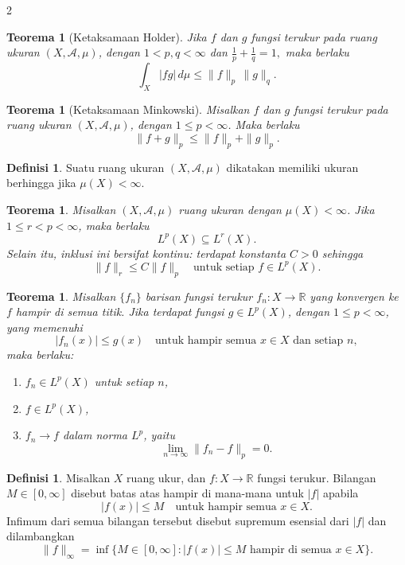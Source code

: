 \documentclass[a4paper,extrafontsizes, 9pt]{memoir}
\theoremstyle{definition}
\newtheorem{definisi}[kalstok]{Definisi}
\theoremstyle{plain}
\newtheorem{teorema}[kalstok]{Teorema}
\theoremstyle{remark}
\begin{document}
\begin{multicols}{2}
  \begin{teorema}[Ketaksamaan Holder]
    Jika $f$ dan $g$ fungsi terukur pada ruang ukuran $(X,\mathcal{A},\mu)$,
    dengan $1<p,q<\infty$ dan
    $\displaystyle\frac{1}{p}+\frac{1}{q}=1,$
    maka berlaku
    \[\int_X |fg|\,d\mu\le\|f\|_p\,\|g\|_q.\]
  \end{teorema}

  \begin{teorema}[Ketaksamaan Minkowski]
    Misalkan $f$ dan $g$ fungsi terukur pada ruang ukuran $(X,\mathcal{A},\mu)$, dengan $1\le p<\infty$.
    Maka berlaku
    \[\|f+g\|_p\le\|f\|_p+\|g\|_p.\]
  \end{teorema}

  \begin{definisi}
    Suatu ruang ukuran $(X,\mathcal{A},\mu)$ dikatakan memiliki ukuran berhingga jika
    $\mu(X)<\infty.$
  \end{definisi}

  \begin{teorema}
    Misalkan $(X,\mathcal{A},\mu)$ ruang ukuran dengan $\mu(X)<\infty$. Jika $1\le r<p<\infty$, maka berlaku
    \[L^p(X)\subseteq L^r(X).\]
    Selain itu, inklusi ini bersifat kontinu: terdapat konstanta $C>0$ sehingga
    \[\|f\|_r\le C\|f\|_p\quad\text{untuk setiap }f\in L^p(X).\]
  \end{teorema}

  \begin{teorema}
    Misalkan $\{f_n\}$ barisan fungsi terukur $f_n:X\to\mathbb{R}$ yang konvergen ke $f$ hampir di semua titik.
    Jika terdapat fungsi $g\in L^p(X)$, dengan $1\le p<\infty$, yang memenuhi
    \[|f_n(x)|\le g(x)\quad\text{untuk hampir semua }x\in X\text{ dan setiap }n,\]
    maka berlaku:
    \begin{enumerate}[leftmargin=*, itemsep=0.5mm]
      \item $f_n\in L^p(X)$ untuk setiap $n$,
      \item $f\in L^p(X)$,
      \item $f_n\to f$ dalam norma $L^p$, yaitu
            \[\lim_{n\to\infty}\|f_n-f\|_p=0.\]
    \end{enumerate}
  \end{teorema}

  \begin{definisi}
    Misalkan $X$ ruang ukur, dan $f:X\to\mathbb{R}$ fungsi terukur.
    Bilangan $M\in[0,\infty]$ disebut batas atas hampir di mana-mana untuk $|f|$ apabila
    \[|f(x)|\le M\quad\text{untuk hampir semua }x\in X.\]
    Infimum dari semua bilangan tersebut disebut supremum esensial dari $|f|$ dan dilambangkan
    \[\|f\|_{\infty}=\inf\{M\in[0,\infty]:|f(x)|\le M\text{ hampir di semua }x\in X\}.\]
  \end{definisi}


\end{multicols}
\end{document}
